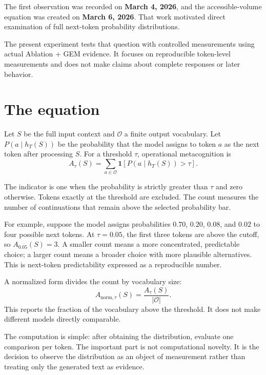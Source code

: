 \documentclass[11pt,a4paper]{article}
\begin{document}
The first observation was recorded on \textbf{March 4, 2026}, and the accessible-volume equation was created on \textbf{March 6, 2026}. That work motivated direct examination of full next-token probability distributions.

The present experiment tests that question with controlled measurements using actual Ablation + GEM evidence. It focuses on reproducible token-level measurements and does not make claims about complete responses or later behavior.

\section{The equation}
Let $S$ be the full input context and $\mathcal{O}$ a finite output vocabulary. Let $P(a\mid h_T(S))$ be the probability that the model assigns to token $a$ as the next token after processing $S$. For a threshold $\tau$, operational metacognition is
\begin{equation}
A_\tau(S)=\sum_{a\in\mathcal{O}}\mathbf{1}\!\left[P(a\mid h_T(S))>\tau\right].
\label{eq:accessible-volume}
\end{equation}

The indicator is one when the probability is strictly greater than $\tau$ and zero otherwise. Tokens exactly at the threshold are excluded. The count measures the number of continuations that remain above the selected probability bar.

For example, suppose the model assigns probabilities $0.70$, $0.20$, $0.08$, and $0.02$ to four possible next tokens. At $\tau=0.05$, the first three tokens are above the cutoff, so $A_{0.05}(S)=3$. A smaller count means a more concentrated, predictable choice; a larger count means a broader choice with more plausible alternatives. This is next-token predictability expressed as a reproducible number.

A normalized form divides the count by vocabulary size:
\begin{equation}
A_{\mathrm{norm},\tau}(S)=\frac{A_\tau(S)}{|\mathcal{O}|}.
\end{equation}
This reports the fraction of the vocabulary above the threshold. It does not make different models directly comparable.

The computation is simple: after obtaining the distribution, evaluate one comparison per token. The important part is not computational novelty. It is the decision to observe the distribution as an object of measurement rather than treating only the generated text as evidence.
\end{document}
